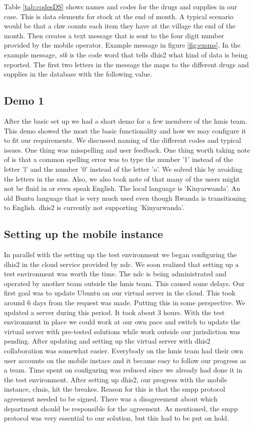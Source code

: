 Table \ref{tab:codesDS} shows names and codes for the drugs and supplies in our case. 
This is data elements for stock at the end of month.
A typical scenario would be that a \gls{chw} counts each item they have at the village the end of the month. Then creates a text message that is sent to the four digit number provided by the mobile operator. Example message in figure \ref{fig:exsms}. In the example message, \textit{stk} is the code word that tells \gls{dhis2} what kind of data is being reported. The first two letters in the message the maps to the different drugs and supplies in the database with the following value.  

\subsection{Demo 1}
After the basic set up we had a short demo for a few members of the \gls{hmis} team. 
This demo showed the most the basic functionality and how we may configure it to fit our requirements. We discussed naming of the different codes and typical issues. One thing was misspelling and user feedback. 
One thing worth taking note of is that a common spelling error was to type the number '1' instead of the letter 'l' and the number '0' instead of the letter 'o'. We solved this by avoiding the letters in the \gls{sms}. Also, we also took note of that many of the users might not be fluid in or even speak English. The local language is 'Kinyarwanda'. An old Buntu language that is very much used even though Rwanda is transitioning to English. \gls{dhis2} is currently not supporting 'Kinyarwanda'.

\subsection{Setting up the mobile instance}
In parallel with the setting up the test environment we began configuring the \gls{dhis2} in the cloud service provided by \gls{ndc}. 
We soon realized that setting up a test environment was worth the time. 
The \gls{ndc} is being administrated and operated by another team outside the \gls{hmis} team. 
This caused some delays. Our first goal was to update Ubuntu on our virtual server in the cloud. 
This took around 6 days from the request was made. Putting this in some perspective. We updated a server during this period. It took about 3 hours. With the test environment in place we could work at our own pace and switch to update the virtual server with pre-tested solutions while work outside our jurisdiction was pending. After updating and setting up the virtual server with \gls{dhis2} collaboration was somewhat easier. Everybody on the \gls{hmis} team had their own user accounts on the mobile instace and it became easy to follow our progress as a team. Time spent on configuring was reduced since we already had done it in the test environment.
After setting up \gls{dhis2}, our progress with the mobile instance, \gls{clmis}, hit the breakes. 
Reason for this is that the \gls{smpp} protocol agreement needed to be signed. There was a disagreement about which department should be responsible for the agreement. As mentioned, the \gls{smpp} protocol was very essential to our solution, but this had to be put on hold.


